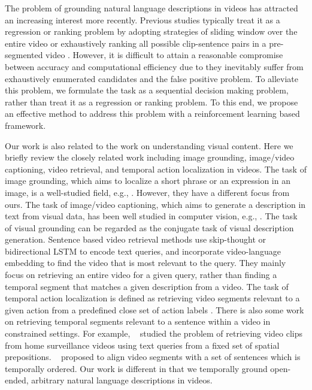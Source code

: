 \documentclass[letterpaper]{article} %
\begin{document}
The problem of grounding natural language descriptions in videos has attracted an increasing interest more recently. Previous studies typically treat it as a regression or ranking problem by adopting strategies of sliding window over the entire video \cite{tall,retrieval_attentive} or exhaustively ranking all possible clip-sentence pairs in a pre-segmented video \cite{mcn}. However, it is difficult to attain a reasonable compromise between accuracy and computational efficiency due to they inevitably suffer from exhaustively enumerated candidates and the false positive problem. To alleviate this problem, we formulate the task as a sequential decision making problem, rather than treat it as a regression or ranking problem. To this end, we propose an effective method to address this problem with a reinforcement learning based framework.

Our work is also related to the work on understanding visual content. Here we briefly review the closely related work including image grounding, image/video captioning, video retrieval, and temporal action localization in videos.
The task of image grounding, which aims to localize a short phrase or an expression in an image, is a well-studied field, e.g., \cite{plummer2015flickr30k,rohrbach2016grounding,Xiao_2017_CVPR,endo2017attention}. However, they have a different focus from ours.
The task of image/video captioning, which aims to generate a description in text from visual data, has been well studied in computer vision, e.g., \cite{xu2015show,pan2016jointly,gan2017semantic,Liang_2017_ICCV}. The task of visual grounding can be regarded as the conjugate task of visual description generation.
Sentence based video retrieval methods \cite{xu2015jointly,lin2014visual,bojanowski2015weakly} use skip-thought \cite{skipthought} or bidirectional LSTM to encode text queries, and incorporate video-language embedding to find the video that is most relevant to the query. They mainly focus on retrieving an entire video for a given query, rather than finding a temporal segment that matches a given description from a video.
The task of temporal action localization is defined as retrieving video segments relevant to a given action from a predefined close set of action labels \cite{localization_multi_stream,SSAD,ssn,lifeifei_loc}. There is also some work on retrieving temporal segments relevant to a sentence within a video in constrained settings. For example, \citeauthor{tellex2009towards}~ studied the problem of retrieving video clips from home surveillance videos using text queries from a fixed set of spatial prepositions. \citeauthor{bojanowski2015weakly}~ proposed to align video segments with a set of sentences which is temporally ordered. Our work is different in that we temporally ground open-ended, arbitrary natural language descriptions in videos.
\end{document}

